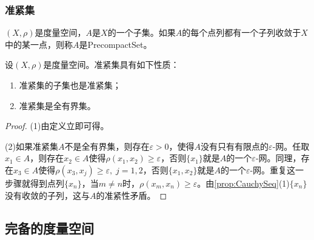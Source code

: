 \subsubsection{准紧集}
\begin{definition}
	$(X,\rho)$是度量空间，$A$是$X$的一个子集。如果$A$的每个点列都有一个子列收敛于$X$中的某一点，则称$A$是\gls{PrecompactSet}。
\end{definition}
\begin{property}\label{prop:PrecompactSet}
	设$(X,\rho)$是度量空间。准紧集具有如下性质：
	\begin{enumerate}
		\item 准紧集的子集也是准紧集；
		\item 准紧集是全有界集。
	\end{enumerate}
\end{property}
\begin{proof}
	(1)由定义立即可得。\par
	(2)如果准紧集$A$不是全有界集，则存在$\varepsilon>0$，使得$A$没有只有有限点的$\varepsilon$-网。任取$x_1\in A$，则存在$x_2\in A$使得$\rho(x_1,x_2)\geqslant\varepsilon$，否则$\{x_1\}$就是$A$的一个$\varepsilon$-网。同理，存在$x_3\in A$使得$\rho(x_3,x_j)\geqslant\varepsilon,\;j=1,2$，否则$\{x_1,x_2\}$就是$A$的一个$\varepsilon$-网。重复这一步骤就得到点列$\{x_n\}$，当$m\ne n$时，$\rho(x_m,x_n)\geqslant\varepsilon$。由\cref{prop:CauchySeq}(1)$\{x_n\}$没有收敛的子列，这与$A$的准紧性矛盾。\par
\end{proof}

\subsection{完备的度量空间}
